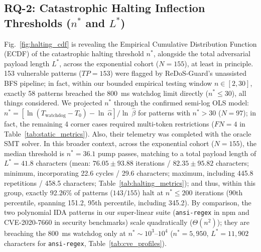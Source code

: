 \documentclass{ieeeaccess}
\begin{document}
\subsection{RQ-2: Catastrophic Halting Inflection Thresholds ($n^*$ and $L^*$)}
Fig.~\ref{fig:halting_cdf} is revealing the Empirical Cumulative Distribution Function (ECDF) of the catastrophic halting threshold $n^*$, alongside the total adversarial payload length $L^*$, across the exponential cohort ($N=155$), at least in principle. 153 vulnerable patterns ($TP=153$) were flagged by ReDoS-Guard's unassisted BFS pipeline; in fact, within our bounded empirical testing window $n \in [2, 30]$, exactly 58 patterns breached the 800~ms watchdog limit directly ($n^* \le 30$), all things considered. We projected $n^*$ through the confirmed semi-log OLS model: $n^* = [\ln(T_{\mathrm{watchdog}} - T_0) - \ln\ \hat{\alpha}] / \ln\ \hat{\beta}$ for patterns with $n^* > 30$ ($N=97$); in fact, the remaining 4 corner cases required multi-token restrictions ($FN=4$ in Table~\ref{tab:static_metrics}). Also, their telemetry was completed with the oracle SMT solver. In this broader context, across the exponential cohort ($N=155$), the median threshold is $n^* = 36.1$ pump passes, matching to a total payload length of $L^* = 41.8$ characters (mean: $76.05 \pm 93.88$ iterations / $82.35 \pm 95.82$ characters; minimum, incorporating 22.6 cycles / 29.6 characters; maximum, including 445.8 repetitions / 458.5 characters; Table~\ref{tab:halting_metrics}); and thus, within this group, exactly 92.26\% of patterns ($143/155$) halt at $n^* \le 200$ iterations (90th percentile, spanning 151.2, 95th percentile, including 345.2). By comparison, the two polynomial IDA patterns in our super-linear suite (\texttt{ansi-regex} in npm and CVE-2020-7660 in security benchmarks) scale quadratically ($\Theta(n^2)$); they are breaching the 800~ms watchdog only at $n^* \sim 10^3\text{--}10^4$ ($n^* = 5{,}950$, $L^* = 11{,}902$ characters for \texttt{ansi-regex}, Table~\ref{tab:cve_profiles}).

\end{document}
